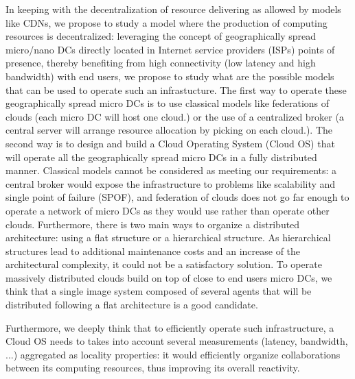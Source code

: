 In keeping with the decentralization of resource delivering as allowed by models
like CDNs, we propose to study a model where the production of computing 
resources is decentralized: leveraging the concept of geographically spread 
micro/nano DCs \cite{greenberg:2008} directly located in Internet service 
providers (ISPs) points of presence, thereby benefiting from high connectivity 
(low latency and high bandwidth) with end users, we propose to study what are 
the possible models that can be used to operate such an infrastucture. The first
way to operate these geographically spread micro DCs is to use classical models 
like federations of clouds (each micro DC will host one cloud.) or the use of a
centralized broker (a central server will arrange resource allocation by picking
on each cloud.). The second way is to design and build a Cloud Operating System 
(Cloud OS) that will operate all the geographically spread micro DCs in a fully 
distributed manner. Classical models cannot be considered as meeting our 
requirements: a central broker would expose the infrastructure to problems like 
scalability and single point of failure (SPOF), and federation of clouds does 
not go far enough to operate a network of micro DCs as they would use rather than 
operate other clouds. Furthermore, there is two main ways to organize a 
distributed architecture: using a flat structure or a hierarchical structure. As
hierarchical structures lead to additional maintenance costs and an increase of 
the architectural complexity, it could not be a satisfactory solution. To 
operate massively distributed clouds build on top of close to end users micro 
DCs, we think that a single image system composed of several agents that will be 
distributed following a flat architecture is a good candidate. 

Furthermore, we deeply think that to efficiently operate such infrastructure, a 
Cloud OS needs to takes into account several measurements (latency, bandwidth, 
...) aggregated as locality properties: it would efficiently organize 
collaborations between its computing resources, thus improving its overall 
reactivity. 

